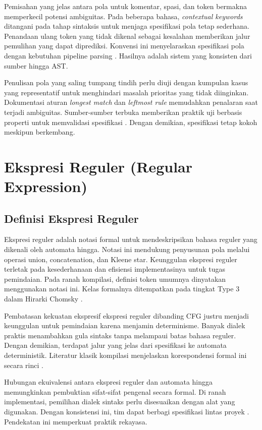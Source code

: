 \documentclass[../main.tex]{subfiles}
\begin{document}
Pemisahan yang jelas antara pola untuk komentar, spasi, dan token bermakna memperkecil potensi ambiguitas. Pada beberapa bahasa, \emph{contextual keywords} ditangani pada tahap sintaksis untuk menjaga spesifikasi pola tetap sederhana. Penandaan ulang token yang tidak dikenal sebagai kesalahan memberikan jalur pemulihan yang dapat diprediksi. Konvensi ini menyelaraskan spesifikasi pola dengan kebutuhan pipeline parsing \citep{FlexManual}. Hasilnya adalah sistem yang konsisten dari sumber hingga AST.

Penulisan pola yang saling tumpang tindih perlu diuji dengan kumpulan kasus yang representatif untuk menghindari masalah prioritas yang tidak diinginkan. Dokumentasi aturan \emph{longest match} dan \emph{leftmost rule} memudahkan penalaran saat terjadi ambiguitas. Sumber-sumber terbuka memberikan praktik uji berbasis properti untuk memvalidasi spesifikasi \citep{FlexManual}. Dengan demikian, spesifikasi tetap kokoh meskipun berkembang.

\section{Ekspresi Reguler (Regular Expression)}
\subsection{Definisi Ekspresi Reguler}
Ekspresi reguler adalah notasi formal untuk mendeskripsikan bahasa reguler yang dikenali oleh automata hingga. Notasi ini mendukung penyusunan pola melalui operasi union, concatenation, dan Kleene star. Keunggulan ekspresi reguler terletak pada kesederhanaan dan efisiensi implementasinya untuk tugas pemindaian. Pada ranah kompilasi, definisi token umumnya dinyatakan menggunakan notasi ini. Kelas formalnya ditempatkan pada tingkat Type 3 dalam Hirarki Chomsky \citep{WikiRegex,WikiChomsky}.

Pembatasan kekuatan ekspresif ekspresi reguler dibanding CFG justru menjadi keunggulan untuk pemindaian karena menjamin determinisme. Banyak dialek praktis menambahkan gula sintaks tanpa melampaui batas bahasa reguler. Dengan demikian, terdapat jalur yang jelas dari spesifikasi ke automata deterministik. Literatur klasik kompilasi menjelaskan korespondensi formal ini secara rinci \citep{Mogensen2010}.

Hubungan ekuivalensi antara ekspresi reguler dan automata hingga memungkinkan pembuktian sifat-sifat pengenal secara formal. Di ranah implementasi, pemilihan dialek sintaks perlu disesuaikan dengan alat yang digunakan. Dengan konsistensi ini, tim dapat berbagi spesifikasi lintas proyek \citep{WikiRegex}. Pendekatan ini memperkuat praktik rekayasa.
\end{document}
